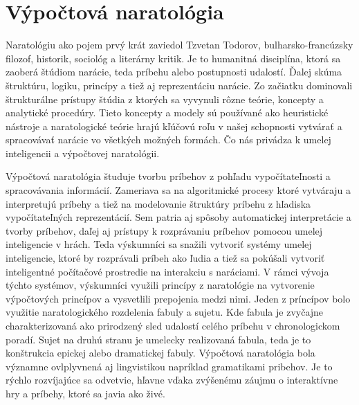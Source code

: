 \section{Výpočtová naratológia}
Naratológiu ako pojem prvý krát zaviedol Tzvetan Todorov, bulharsko-francúzsky filozof, historik, sociológ a literárny kritik. Je to humanitná disciplína, ktorá sa zaoberá štúdiom narácie, teda príbehu alebo postupnosti udalostí. Ďalej skúma štruktúru, logiku, princípy a tiež aj reprezentáciu narácie. Zo začiatku dominovali štrukturálne prístupy štúdia z ktorých sa vyvynuli rôzne teórie, koncepty a analytické procedúry. Tieto koncepty a modely sú používané ako heuristické nástroje a naratologické teórie hrajú kľúčovú roľu v našej schopnosti vytvárať a spracovávať narácie vo všetkých možných formách. Čo nás privádza k umelej inteligencii a výpočtovej naratológii.\par
Výpočtová naratológia študuje tvorbu príbehov z pohľadu vypočítateľnosti a spracovávania informácií. Zameriava sa na algoritmické procesy ktoré vytváraju a interpretujú príbehy a tiež na modelovanie štruktúry príbehu z hľadiska vypočítateľných reprezentácií. Sem patria aj spôsoby automatickej interpretácie a tvorby príbehov, daľej aj prístupy k rozprávaniu príbehov pomocou umelej inteligencie v hrách. Teda výskumníci sa snažili vytvoriť systémy umelej inteligencie, ktoré by rozprávali príbeh ako ľudia a tiež sa pokúšali vytvoriť inteligentné počítačové prostredie na interakciu s naráciami. V rámci vývoja týchto systémov, výskumníci využili princípy z naratológie na vytvorenie výpočtových princípov a vysvetlili prepojenia medzi nimi. Jeden z príncípov bolo využitie naratologického rozdelenia fabuly a sujetu. Kde fabula je zvyčajne charakterizovaná ako prirodzený sled udalostí celého príbehu v chronologickom poradí. Sujet na druhú stranu je umelecky realizovaná fabula, teda je to konštrukcia epickej alebo dramatickej fabuly. Výpočtová naratológia bola významne ovlplyvnená aj lingvistikou napríklad gramatikami pribehov. Je to rýchlo rozvíjajúce sa odvetvie, hľavne vďaka zvýšenému záujmu o interaktívne hry a príbehy, ktoré sa javia ako živé.
